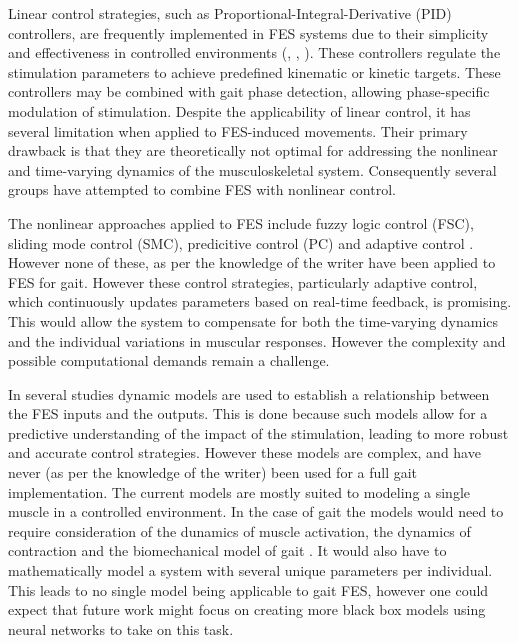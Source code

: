 Linear control strategies, such as Proportional-Integral-Derivative (PID) controllers, are frequently implemented in FES systems due to their simplicity and effectiveness in controlled environments (\cite{chaikho_transcutaneous_2022}, \cite{bouri_closed-loop_2018}, \cite{dodson_experimental_2017}). These controllers regulate the stimulation parameters to achieve predefined kinematic or kinetic targets. These controllers may be combined with gait phase detection, allowing phase-specific modulation of stimulation. Despite the applicability of linear control, it has several limitation when applied to FES-induced movements. Their primary drawback is that they are theoretically not optimal for addressing the nonlinear and time-varying dynamics of the musculoskeletal system. Consequently several groups have attempted to combine FES with nonlinear control.

The nonlinear approaches applied to FES include fuzzy logic control (FSC), sliding mode control (SMC), predicitive control (PC) and adaptive control \cite{chaikho_transcutaneous_2022} . However none of these, as per the knowledge of the writer have been applied to FES for gait. However these control strategies, particularly adaptive control, which continuously updates parameters based on real-time feedback, is promising. This would allow the system to compensate for both the time-varying dynamics and the individual variations in muscular responses. However the complexity and possible computational demands remain a challenge. 

In several studies  dynamic models are used to establish a relationship between the FES inputs and the outputs. This is done because such models allow for a predictive understanding of the impact of the stimulation, leading to more robust and accurate control strategies. However these models are complex, and have never (as per the knowledge of the writer) been used for a full gait implementation. The current models  are mostly suited to modeling a single muscle in a controlled environment. In the case of gait the models would need to require consideration of the dunamics of muscle activation, the dynamics of contraction and the biomechanical model of gait \cite{chaikho_transcutaneous_2022}. It would also have to mathematically model a system with several unique parameters per individual. This leads to no single model being applicable to gait FES, however one could expect that future work might focus on creating more black box models using neural networks to take on this task.

